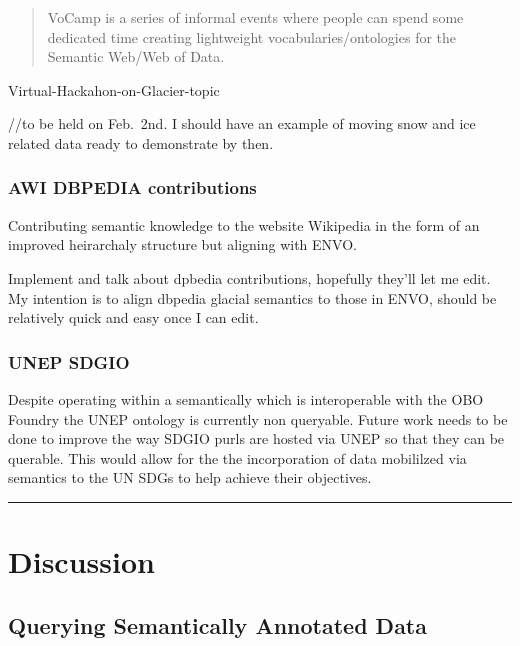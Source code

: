 \documentclass[]{article}
\begin{document}
\begin{quote}
VoCamp is a series of informal events where people can spend some
dedicated time creating lightweight vocabularies/ontologies for the
Semantic Web/Web of Data.
\end{quote}

Virtual-Hackahon-on-Glacier-topic

//to be held on Feb.~2nd. I should have an example of moving snow and
ice related data ready to demonstrate by then.

\hypertarget{awi-dbpedia-contributions}{%
\subsubsection{AWI DBPEDIA
contributions}\label{awi-dbpedia-contributions}}

Contributing semantic knowledge to the website Wikipedia in the form of
an improved heirarchaly structure but aligning with ENVO.

Implement and talk about dpbedia contributions, hopefully they'll let me
edit. My intention is to align dbpedia glacial semantics to those in
ENVO, should be relatively quick and easy once I can edit.

\hypertarget{unep-sdgio}{%
\subsubsection{UNEP SDGIO}\label{unep-sdgio}}

Despite operating within a semantically which is interoperable with the
OBO Foundry the UNEP ontology is currently non queryable. Future work
needs to be done to improve the way SDGIO purls are hosted via UNEP so
that they can be querable. This would allow for the the incorporation of
data mobililzed via semantics to the UN SDGs to help achieve their
objectives.

\begin{center}\rule{0.5\linewidth}{\linethickness}\end{center}

\hypertarget{discussion}{%
\section{Discussion}\label{discussion}}

\hypertarget{querying-semantically-annotated-data}{%
\subsection{Querying Semantically Annotated
Data}\label{querying-semantically-annotated-data}}
\end{document}
